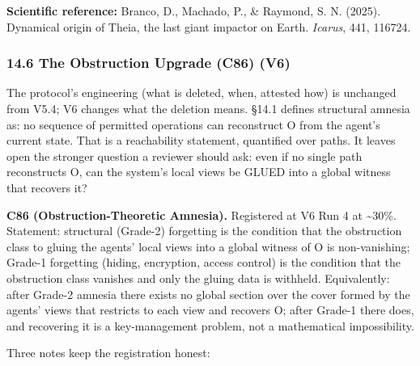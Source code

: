 \documentclass[
  11pt,
]{article}
\begin{document}
\textbf{Scientific reference:} Branco, D., Machado, P., \& Raymond, S.
N. (2025). Dynamical origin of Theia, the last giant impactor on Earth.
\emph{Icarus}, 441, 116724.

\subsubsection{14.6 The Obstruction Upgrade (C86)
(V6)}\label{the-obstruction-upgrade-c86-v6}

The protocol's engineering (what is deleted, when, attested how) is
unchanged from V5.4; V6 changes what the deletion means. §14.1 defines
structural amnesia as: no sequence of permitted operations can
reconstruct O from the agent's current state. That is a reachability
statement, quantified over paths. It leaves open the stronger question a
reviewer should ask: even if no single path reconstructs O, can the
system's local views be GLUED into a global witness that recovers it?

\textbf{C86 (Obstruction-Theoretic Amnesia).} Registered at V6 Run 4 at
\textasciitilde30\%. Statement: structural (Grade-2) forgetting is the
condition that the obstruction class to gluing the agents' local views
into a global witness of O is non-vanishing; Grade-1 forgetting (hiding,
encryption, access control) is the condition that the obstruction class
vanishes and only the gluing data is withheld. Equivalently: after
Grade-2 amnesia there exists no global section over the cover formed by
the agents' views that restricts to each view and recovers O; after
Grade-1 there does, and recovering it is a key-management problem, not a
mathematical impossibility.

Three notes keep the registration honest:
\end{document}

